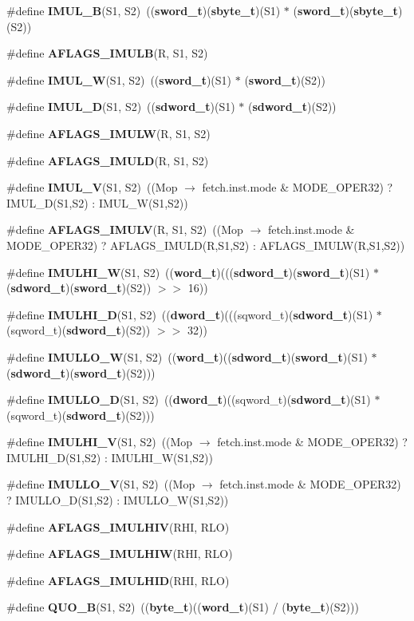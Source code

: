 \begin{CompactItemize}
\item 
\#define {\bf IMUL\_\-B}(S1, S2)~(({\bf sword\_\-t})({\bf sbyte\_\-t})(S1) $\ast$ ({\bf sword\_\-t})({\bf sbyte\_\-t})(S2))
\item 
\#define {\bf AFLAGS\_\-IMULB}(R, S1, S2)
\item 
\#define {\bf IMUL\_\-W}(S1, S2)~(({\bf sword\_\-t})(S1) $\ast$ ({\bf sword\_\-t})(S2))
\item 
\#define {\bf IMUL\_\-D}(S1, S2)~(({\bf sdword\_\-t})(S1) $\ast$ ({\bf sdword\_\-t})(S2))
\item 
\#define {\bf AFLAGS\_\-IMULW}(R, S1, S2)
\item 
\#define {\bf AFLAGS\_\-IMULD}(R, S1, S2)
\item 
\#define {\bf IMUL\_\-V}(S1, S2)~((Mop $\rightarrow$ fetch.inst.mode \& MODE\_\-OPER32) ? IMUL\_\-D(S1,S2) : IMUL\_\-W(S1,S2))
\item 
\#define {\bf AFLAGS\_\-IMULV}(R, S1, S2)~((Mop $\rightarrow$ fetch.inst.mode \& MODE\_\-OPER32) ? AFLAGS\_\-IMULD(R,S1,S2) : AFLAGS\_\-IMULW(R,S1,S2))
\item 
\#define {\bf IMULHI\_\-W}(S1, S2)~(({\bf word\_\-t})((({\bf sdword\_\-t})({\bf sword\_\-t})(S1) $\ast$ ({\bf sdword\_\-t})({\bf sword\_\-t})(S2)) $>$$>$ 16))
\item 
\#define {\bf IMULHI\_\-D}(S1, S2)~(({\bf dword\_\-t})(((sqword\_\-t)({\bf sdword\_\-t})(S1) $\ast$ (sqword\_\-t)({\bf sdword\_\-t})(S2)) $>$$>$ 32))
\item 
\#define {\bf IMULLO\_\-W}(S1, S2)~(({\bf word\_\-t})(({\bf sdword\_\-t})({\bf sword\_\-t})(S1) $\ast$ ({\bf sdword\_\-t})({\bf sword\_\-t})(S2)))
\item 
\#define {\bf IMULLO\_\-D}(S1, S2)~(({\bf dword\_\-t})((sqword\_\-t)({\bf sdword\_\-t})(S1) $\ast$ (sqword\_\-t)({\bf sdword\_\-t})(S2)))
\item 
\#define {\bf IMULHI\_\-V}(S1, S2)~((Mop $\rightarrow$ fetch.inst.mode \& MODE\_\-OPER32) ? IMULHI\_\-D(S1,S2) : IMULHI\_\-W(S1,S2))
\item 
\#define {\bf IMULLO\_\-V}(S1, S2)~((Mop $\rightarrow$ fetch.inst.mode \& MODE\_\-OPER32) ? IMULLO\_\-D(S1,S2) : IMULLO\_\-W(S1,S2))
\item 
\#define {\bf AFLAGS\_\-IMULHIV}(RHI, RLO)
\item 
\#define {\bf AFLAGS\_\-IMULHIW}(RHI, RLO)
\item 
\#define {\bf AFLAGS\_\-IMULHID}(RHI, RLO)
\item 
\#define {\bf QUO\_\-B}(S1, S2)~(({\bf byte\_\-t})(({\bf word\_\-t})(S1) / ({\bf byte\_\-t})(S2)))

\end{CompactItemize}
